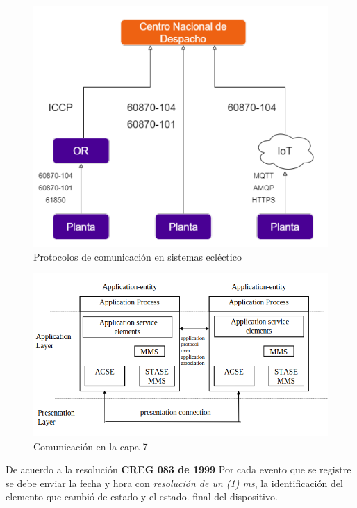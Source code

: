 \documentclass[a5paper]{book}%
\begin{document}
\begin{figure}[H]
  \caption{Protocolos de comunicación en sistemas ecléctico}
  \label{fig:protocoloscomunicacion}
  \includegraphics[width=\linewidth]{protocolos_comunicacion}
\end{figure}

\begin{figure}[H]
  \caption{Comunicación en la capa 7}
  \label{fig:capa7iccp}
  \includegraphics[width=\linewidth]{capas_iccp}
\end{figure}



De acuerdo a la resolución \textbf{CREG 083 de 1999} Por cada evento que se registre se debe enviar la fecha y hora con \textit{resolución de un (1) ms}, la identificación del elemento que cambió de estado y el estado. final del dispositivo.\\\\
\end{document}
